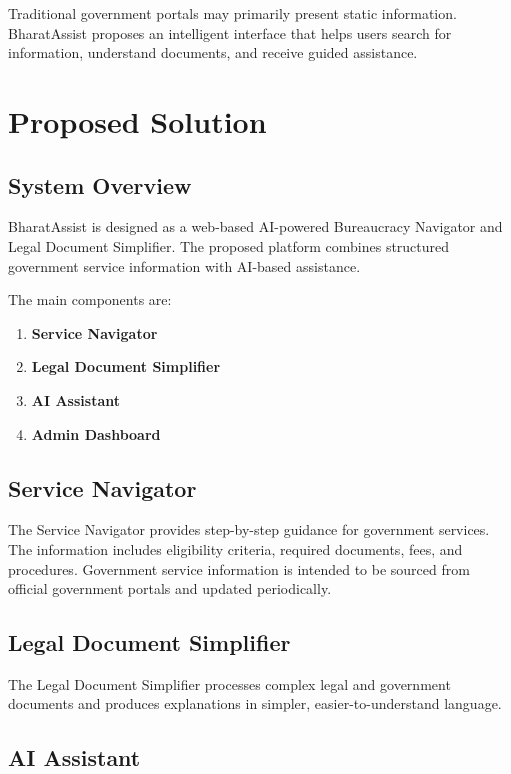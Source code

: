 \documentclass[12pt,a4paper]{report}
\begin{document}
Traditional government portals may primarily present static information. BharatAssist proposes an intelligent interface that helps users search for information, understand documents, and receive guided assistance.

\chapter{Proposed Solution}

\section{System Overview}

BharatAssist is designed as a web-based AI-powered Bureaucracy Navigator and Legal Document Simplifier. The proposed platform combines structured government service information with AI-based assistance.

The main components are:

\begin{enumerate}[leftmargin=*]
    \item \textbf{Service Navigator}
    \item \textbf{Legal Document Simplifier}
    \item \textbf{AI Assistant}
    \item \textbf{Admin Dashboard}
\end{enumerate}

\section{Service Navigator}

The Service Navigator provides step-by-step guidance for government services. The information includes eligibility criteria, required documents, fees, and procedures. Government service information is intended to be sourced from official government portals and updated periodically.

\section{Legal Document Simplifier}

The Legal Document Simplifier processes complex legal and government documents and produces explanations in simpler, easier-to-understand language.

\section{AI Assistant}
\end{document}

